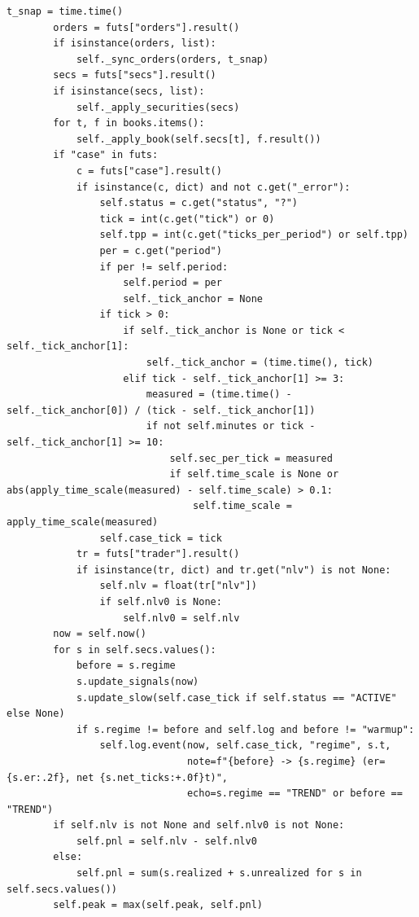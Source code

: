 \begin{lstlisting}[style=algocode]
        t_snap = time.time()
        orders = futs["orders"].result()
        if isinstance(orders, list):
            self._sync_orders(orders, t_snap)
        secs = futs["secs"].result()
        if isinstance(secs, list):
            self._apply_securities(secs)
        for t, f in books.items():
            self._apply_book(self.secs[t], f.result())
        if "case" in futs:
            c = futs["case"].result()
            if isinstance(c, dict) and not c.get("_error"):
                self.status = c.get("status", "?")
                tick = int(c.get("tick") or 0)
                self.tpp = int(c.get("ticks_per_period") or self.tpp)
                per = c.get("period")
                if per != self.period:
                    self.period = per
                    self._tick_anchor = None
                if tick > 0:
                    if self._tick_anchor is None or tick < self._tick_anchor[1]:
                        self._tick_anchor = (time.time(), tick)
                    elif tick - self._tick_anchor[1] >= 3:
                        measured = (time.time() - self._tick_anchor[0]) / (tick - self._tick_anchor[1])
                        if not self.minutes or tick - self._tick_anchor[1] >= 10:
                            self.sec_per_tick = measured
                            if self.time_scale is None or abs(apply_time_scale(measured) - self.time_scale) > 0.1:
                                self.time_scale = apply_time_scale(measured)
                self.case_tick = tick
            tr = futs["trader"].result()
            if isinstance(tr, dict) and tr.get("nlv") is not None:
                self.nlv = float(tr["nlv"])
                if self.nlv0 is None:
                    self.nlv0 = self.nlv
        now = self.now()
        for s in self.secs.values():
            before = s.regime
            s.update_signals(now)
            s.update_slow(self.case_tick if self.status == "ACTIVE" else None)
            if s.regime != before and self.log and before != "warmup":
                self.log.event(now, self.case_tick, "regime", s.t,
                               note=f"{before} -> {s.regime} (er={s.er:.2f}, net {s.net_ticks:+.0f}t)",
                               echo=s.regime == "TREND" or before == "TREND")
        if self.nlv is not None and self.nlv0 is not None:
            self.pnl = self.nlv - self.nlv0
        else:
            self.pnl = sum(s.realized + s.unrealized for s in self.secs.values())
        self.peak = max(self.peak, self.pnl)


\end{lstlisting}

